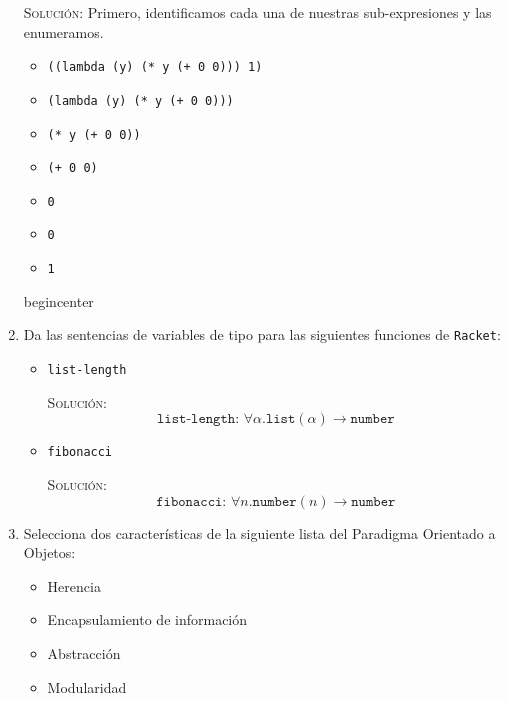 \documentclass[letterpaper,11pt]{article}
\begin{document}
\begin{enumerate}
    \textsc{Solución:} Primero, identificamos cada una de nuestras 
    sub-expresiones y las enumeramos.
    \begin{itemize}
        \item {} \texttt{((lambda (y) (* y (+ 0 0))) 1)}
        \item {} \texttt{(lambda (y) (* y (+ 0 0)))}
        \item {} \texttt{(* y (+ 0 0))}
        \item {} \texttt{(+ 0 0)}
        \item {} \texttt{0}
        \item {} \texttt{0}
        \item {} \texttt{1}
    \end{itemize}

    begin{center}


    \item Da las sentencias de variables de tipo para las siguientes funciones 
    de \texttt{Racket}:
    \begin{itemize}
        \item \texttt{list-length}

        \textsc{Solución:}
        \begin{equation*}
            \texttt{list-length: }\forall \alpha. \texttt{list}(\alpha) 
        \rightarrow \texttt{number}
        \end{equation*}

        \item \texttt{fibonacci}
        
        \textsc{Solución:} 
        \begin{equation*}
            \texttt{fibonacci: } \forall n. \texttt{number}(n) \rightarrow 
            \texttt{number}
        \end{equation*}
    \end{itemize}

    \item Selecciona dos características de la siguiente lista del Paradigma 
    Orientado a Objetos:
    \begin{itemize}
        \item Herencia
        \item Encapsulamiento de información
        \item Abstracción
        \item Modularidad
    \end{itemize}


\end{enumerate}
\end{document}
